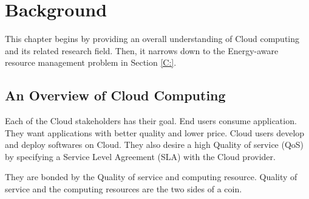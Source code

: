 \section{Background}

This chapter begins by providing an overall understanding of Cloud computing and its related research field.
Then, it narrows down to the Energy-aware resource management problem in Section \ref{C:}.


\subsection{An Overview of Cloud Computing}



Each of the Cloud stakeholders has their goal. End users consume application. They want applications with better quality and lower price. Cloud users develop and deploy softwares on Cloud. They also desire a high Quality of service (QoS) by specifying a Service Level Agreement (SLA) with the Cloud provider. 

They are bonded by the Quality of service and computing resource. Quality of service and the computing resources are the two sides of a coin. 


